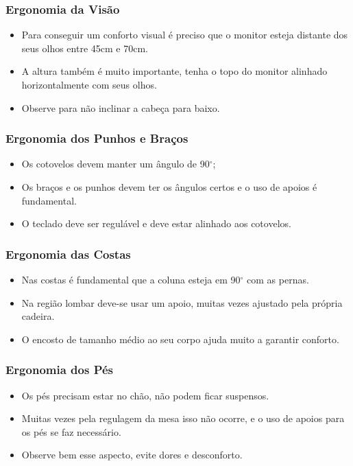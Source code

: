 \documentclass[aspectratio=169]{beamer} %
\begin{document}
\begin{frame}
	\frametitle{Ergonomia da Visão}
	
	\begin{itemize}
		\item Para conseguir um conforto visual é preciso que o monitor esteja distante dos seus olhos entre 45cm e 70cm. 
		\item A altura também é muito importante, tenha o topo do monitor alinhado horizontalmente com seus olhos. 
		\item Observe para não inclinar a cabeça para baixo.
	\end{itemize}
\end{frame}

\begin{frame}
	\frametitle{Ergonomia dos Punhos e Braços}
	
	\begin{itemize}
		\item Os cotovelos devem manter um ângulo de 90$^{\circ}$;
		\item Os braços e os punhos devem ter os ângulos certos e o uso de apoios é fundamental. 
		\item O teclado deve ser regulável e deve estar alinhado aos cotovelos.
	\end{itemize}
\end{frame}

\begin{frame}
	\frametitle{Ergonomia das Costas}
	
	\begin{itemize}
		\item Nas costas é fundamental que a coluna esteja em 90$^{\circ}$ com as pernas. 
		\item Na região lombar deve-se usar um apoio, muitas vezes ajustado pela própria cadeira. 
		\item O encosto de tamanho médio ao seu corpo ajuda muito a garantir conforto.
	\end{itemize}
\end{frame}

\begin{frame}
	\frametitle{Ergonomia dos Pés}
	
	\begin{itemize}
		\item Os pés precisam estar no chão, não podem ficar suspensos. 
		\item Muitas vezes pela regulagem da mesa isso não ocorre, e o uso de apoios para os pés se faz necessário. 
		\item Observe bem esse aspecto, evite dores e desconforto.
	\end{itemize}
\end{frame}
\end{document}
